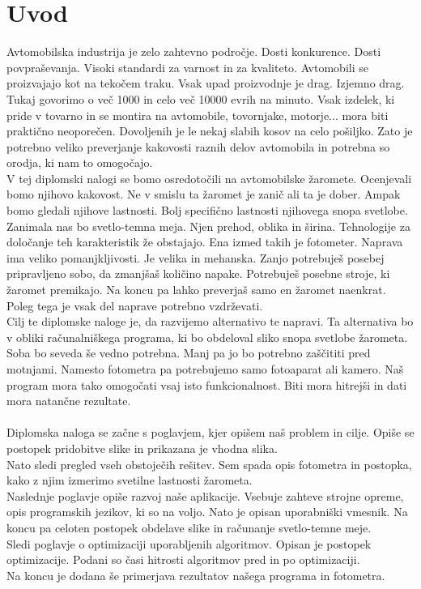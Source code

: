 \documentclass[oneside, a4paper, 12pt]{book}
\begin{document}
\chapter{Uvod}
Avtomobilska industrija je zelo zahtevno področje. Dosti konkurence. Dosti povpraševanja. Visoki standardi za varnost in za kvaliteto. Avtomobili se proizvajajo kot na tekočem traku. Vsak upad proizvodnje je drag. Izjemno drag. Tukaj govorimo o več 1000 in celo več 10000 evrih na minuto. Vsak izdelek, ki pride v tovarno in se montira na avtomobile, tovornjake, motorje... mora biti praktično neoporečen. Dovoljenih je le nekaj slabih kosov na celo pošiljko. Zato je potrebno veliko preverjanje kakovosti raznih delov avtomobila in potrebna so orodja, ki nam to omogočajo.\\
V tej diplomski nalogi se bomo osredotočili na avtomobilske žaromete. Ocenjevali bomo njihovo kakovost. Ne v smislu ta žaromet je zanič ali ta je dober. Ampak bomo gledali njihove lastnosti. Bolj specifično lastnosti njihovega snopa svetlobe. \\
Zanimala nas bo svetlo-temna meja. Njen prehod, oblika in širina. Tehnologije za določanje teh karakteristik že obstajajo. Ena izmed takih je fotometer. Naprava ima veliko pomanjkljivosti. Je velika in mehanska. Zanjo potrebuješ posebej pripravljeno sobo, da zmanjšaš količino napake. Potrebuješ posebne stroje, ki žaromet premikajo. Na koncu pa lahko preverjaš samo en žaromet naenkrat. Poleg tega je vsak del naprave potrebno vzdrževati.\\
Cilj te diplomske naloge je, da razvijemo alternativo te napravi. Ta alternativa bo v obliki računalniškega programa, ki bo obdeloval sliko snopa svetlobe žarometa. Soba bo seveda še vedno potrebna. Manj pa jo bo potrebno zaščititi pred motnjami. Namesto fotometra pa potrebujemo samo fotoaparat ali kamero. Naš program mora tako omogočati vsaj isto funkcionalnost. Biti mora hitrejši in dati mora natančne rezultate.\\
\\
Diplomska naloga se začne s poglavjem, kjer opišem naš problem in cilje. Opiše se postopek pridobitve slike in prikazana je vhodna slika.\\
Nato sledi pregled vseh obstoječih rešitev. Sem spada opis fotometra in postopka, kako z njim izmerimo svetilne lastnosti žarometa.\\
Naslednje poglavje opiše razvoj naše aplikacije. Vsebuje zahteve strojne opreme, opis programskih jezikov, ki so na voljo. Nato je opisan uporabniški vmesnik. Na koncu pa celoten postopek obdelave slike in računanje svetlo-temne meje.\\
Sledi poglavje o optimizaciji uporabljenih algoritmov. Opisan je postopek optimizacije. Podani so časi hitrosti algoritmov pred in po optimizaciji.\\
Na koncu je dodana še primerjava rezultatov našega programa in fotometra.
\end{document}
